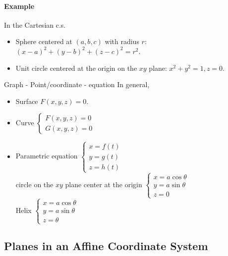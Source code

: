 \documentclass[11pt]{book}
\begin{document}
\paragraph{Example}
In the Cartesian c.s.
\begin{itemize} 
  \item Sphere centered at $(a,b,c)$ with radius $r$: $(x-a)^2+(y-b)^2+(z-c)^2=r^2$.
  \item Unit circle centered at the origin on the $xy$ plane: $x^2+y^2=1,z=0$.
\end{itemize}
Graph - Point/coordinate - equation
In general,
\begin{itemize}
  \item Surface $F(x,y,z)=0$.
  \item Curve 
  $\left\{\begin{array}{l}
    F(x, y, z)=0 \\
    G(x, y, z)=0
    \end{array}\right.$
  \item Parametric equation 
    $\left\{\begin{array}{l}
    x=f(t) \\
    y=g(t) \\
    z=h(t)
    \end{array}\right.
  $\\
  circle on the $xy$ plane center at the origin
  $\left\{\begin{array}{l}
    x=a\cos \theta \\
    y=a \sin \theta\\
    z=0
    \end{array}\right.
  $\\
  Helix
  $\left\{\begin{array}{l}
    x=a\cos \theta \\
    y=a \sin \theta\\
    z=\theta
    \end{array}\right.
  $\\
\end{itemize}
\subsection{Planes in an Affine Coordinate System}
\end{document}
